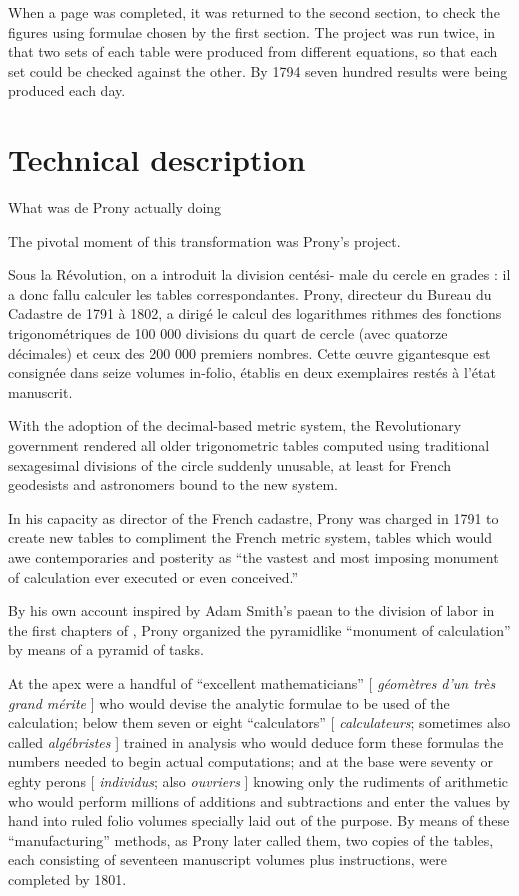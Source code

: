 \documentclass[version=last,draft=true,paper=A4,portrait,twoside=true,twocolumn=false,headinclude=false,footinclude=false,fontsize=12,BCOR=20mm,DIV=calc,pagesize=auto,titlepage=firstiscover,mpinclude=true,open=right,chapterprefix=true,numbers=autoendperiod,headsepline=false,headings=twolinechapter,parskip=false]{scrbook}
\begin{document}
When a page was completed, it was returned to the second section, to
check the figures using formulae chosen by the first section. The project
was run twice, in that two sets of each table were produced from different
equations, so that each set could be checked against the other. By 1794
seven hundred results were being produced each day.

\section{Technical description}
\label{sec:org8de8630}
What was de Prony actually doing

The pivotal moment of this transformation was Prony's project. 

Sous la Révolution, on a introduit la division centési- male du cercle en
grades : il a donc fallu calculer les tables correspondantes. Prony,
directeur du Bureau du Cadastre de 1791 à 1802, a dirigé le calcul des
logarithmes rithmes des fonctions trigonométriques de 100 000 divisions du
quart de cercle (avec quatorze décimales) et ceux des 200 000 premiers
nombres. Cette œuvre gigantesque est consignée dans seize volumes in-folio,
établis en deux exemplaires restés à l’état manuscrit.

With the adoption of the decimal-based metric system, the Revolutionary
government rendered all older trigonometric tables computed using
traditional sexagesimal divisions of the circle suddenly unusable, at least
for French geodesists and astronomers bound to the new system. 

In his capacity as director of the French cadastre, Prony was charged in
1791 to create new tables to compliment the French metric system, tables
which would awe contemporaries and posterity as ``the vastest and most
imposing monument of calculation ever executed or even conceived.''

By his own account inspired by Adam Smith's paean to the division of labor
in the first chapters of , Prony organized the pyramidlike
``monument of calculation'' by means of a pyramid of tasks. 

At the apex were a handful of ``excellent mathematicians'' [ \emph{géomètres d'un
très grand mérite} ] who would devise the analytic formulae to be used of
the calculation; below them seven or eight ``calculators'' [ \emph{calculateurs};
sometimes also called \emph{algébristes} ] trained in analysis who would deduce
form these formulas the numbers needed to begin actual computations; and at
the base were seventy or eghty perons [ \emph{individus}; also \emph{ouvriers} ] knowing
only the rudiments of arithmetic who would perform millions of additions
and subtractions and enter the values by hand into ruled folio volumes
specially laid out of the purpose. By means of these ``manufacturing''
methods, as Prony later called them, two copies of the tables, each
consisting of seventeen manuscript volumes plus instructions, were
completed by 1801.
\end{document}
